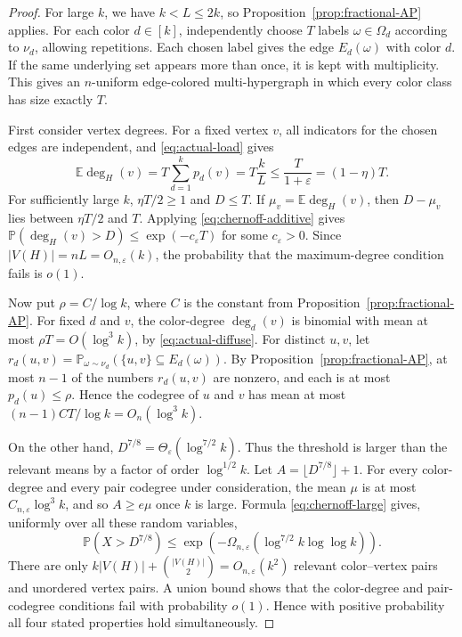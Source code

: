 \documentclass[10pt,a4paper]{amsart}
\numberwithin{equation}{section}
\newcommand{\E}{\mathbb{E}}
\newcommand{\Prob}{\mathbb{P}}
\newcommand{\eps}{\varepsilon}
\begin{document}
\begin{proof}
For large $k$, we have $k<L\le2k$, so Proposition~\ref{prop:fractional-AP}
applies.  For each color $d\in[k]$, independently choose $T$ labels
$\omega\in\Omega_d$ according to $\nu_d$, allowing repetitions.  Each chosen
label gives the edge $E_d(\omega)$ with color $d$.  If the same underlying set
appears more than once, it is kept with multiplicity.  This gives an
$n$-uniform edge-colored multi-hypergraph in which every color class has size
exactly $T$.

First consider vertex degrees.  For a fixed vertex $v$, all indicators for the
chosen edges are independent, and \eqref{eq:actual-load} gives
\[
        \E\deg_H(v)=T\sum_{d=1}^k p_d(v)=T\frac{k}{L}
        \le \frac{T}{1+\eps}=(1-\eta)T.
\]
For sufficiently large $k$, $\eta T/2\ge1$ and $D\le T$.  If
$\mu_v=\E\deg_H(v)$, then $D-\mu_v$ lies between $\eta T/2$ and $T$.  Applying
\eqref{eq:chernoff-additive} gives $\Prob(\deg_H(v)>D)\le\exp(-c_\eps T)$ for
some $c_\eps>0$.  Since $|V(H)|=nL=O_{n,\eps}(k)$, the probability that the
maximum-degree condition fails is $o(1)$.

Now put $\rho=C/\log k$, where $C$ is the constant from
Proposition~\ref{prop:fractional-AP}.  For fixed $d$ and $v$, the color-degree
$\deg_d(v)$ is binomial with mean at most $\rho T=O(\log^3 k)$, by
\eqref{eq:actual-diffuse}.  For distinct $u,v$, let
$r_d(u,v)=\Prob_{\omega\sim\nu_d}(\{u,v\}\subseteq E_d(\omega))$.  By
Proposition~\ref{prop:fractional-AP}, at most $n-1$ of the numbers
$r_d(u,v)$ are nonzero, and each is at most $p_d(u)\le\rho$.  Hence the
codegree of $u$ and $v$ has mean at most $(n-1)CT/\log k=O_n(\log^3 k)$.

On the other hand, $D^{7/8}=\Theta_\eps(\log^{7/2}k)$.  Thus the threshold is
larger than the relevant means by a factor of order $\log^{1/2}k$.  Let
$A=\lfloor D^{7/8}\rfloor+1$.  For every color-degree and every pair codegree
under consideration, the mean $\mu$ is at most $C_{n,\eps}\log^3k$, and so
$A\ge e\mu$ once $k$ is large.  Formula \eqref{eq:chernoff-large} gives,
uniformly over all these random variables,
\[
        \Prob(X>D^{7/8})
        \le \exp\!\left(-\Omega_{n,\eps}(\log^{7/2}k\log\log k)\right).
\]
There are only $k|V(H)|+\binom{|V(H)|}{2}=O_{n,\eps}(k^2)$ relevant
color--vertex pairs and unordered vertex pairs.  A union bound shows that the
color-degree and pair-codegree conditions fail with probability $o(1)$.  Hence
with positive probability all four stated properties hold simultaneously.
\end{proof}
\end{document}
